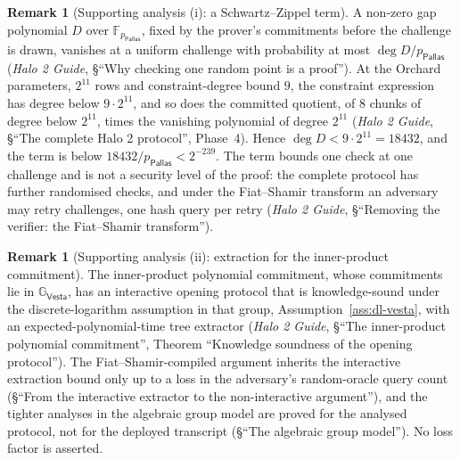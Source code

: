\documentclass[11pt,a4paper]{article}
\theoremstyle{definition}
\newtheorem{remark}[theorem]{Remark}
\newcommand{\F}{\mathbb{F}}
\newcommand{\G}{\mathbb{G}}
\newcommand{\Pallas}{\ensuremath{\mathsf{Pallas}}}
\newcommand{\Vesta}{\ensuremath{\mathsf{Vesta}}}
\begin{document}
\begin{remark}[Supporting analysis (i): a Schwartz--Zippel term]
A non-zero gap polynomial $D$ over $\F_{p_{\Pallas}}$, fixed by the prover's
commitments before the challenge is drawn, vanishes at a uniform challenge
with probability at most $\deg D / p_{\Pallas}$ (\emph{Halo 2 Guide},
\S``Why checking one random point is a proof''). At the Orchard parameters,
$2^{11}$ rows and constraint-degree bound $9$, the constraint expression has
degree below $9 \cdot 2^{11}$, and so does the committed quotient, of $8$
chunks of degree below $2^{11}$, times the vanishing polynomial of degree
$2^{11}$ (\emph{Halo 2 Guide}, \S``The complete Halo 2 protocol'',
Phase~4). Hence $\deg D < 9 \cdot 2^{11} = 18432$, and the term is below
$18432 / p_{\Pallas} < 2^{-239}$. The term bounds one check at one challenge
and is not a security level of the proof: the complete protocol has further
randomised checks, and under the Fiat--Shamir transform an adversary may
retry challenges, one hash query per retry (\emph{Halo 2 Guide},
\S``Removing the verifier: the Fiat--Shamir transform'').
\end{remark}

\begin{remark}[Supporting analysis (ii): extraction for the inner-product
commitment]
The inner-product polynomial commitment, whose commitments lie in
$\G_{\Vesta}$, has an interactive opening protocol that is knowledge-sound
under the discrete-logarithm assumption in that group,
Assumption~\ref{ass:dl-vesta}, with an expected-polynomial-time tree
extractor (\emph{Halo 2 Guide}, \S``The inner-product polynomial
commitment'', Theorem ``Knowledge soundness of the opening protocol'').
The Fiat--Shamir-compiled argument inherits the interactive extraction bound
only up to a loss in the adversary's random-oracle query count
(\S``From the interactive extractor to the non-interactive argument''), and
the tighter analyses in the algebraic group model are proved for the analysed
protocol, not for the deployed transcript (\S``The algebraic group model'').
No loss factor is asserted.
\end{remark}
\end{document}
